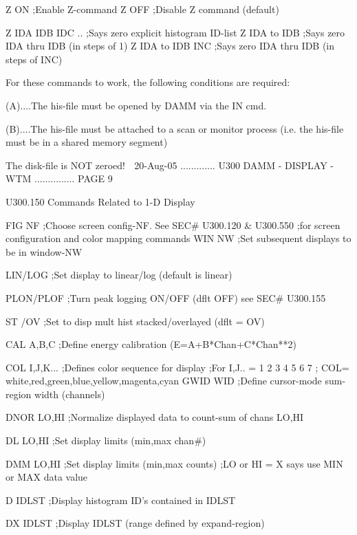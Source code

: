    Z  ON                ;Enable  Z-command
   Z  OFF               ;Disable Z command (default)
 
   Z  IDA IDB IDC ..    ;Says zero explicit histogram ID-list
   Z  IDA to IDB        ;Says zero IDA thru IDB (in steps of 1)
   Z  IDA to IDB INC    ;Says zero IDA thru IDB (in steps of INC)
 
   For these commands to work, the following conditions are required:
 
   (A)....The his-file must be opened by DAMM via the IN cmd.
 
   (B)....The his-file must be attached to a scan or monitor process
          (i.e. the his-file must be in a shared memory segment)
 
                          The disk-file is NOT zeroed!
    
   20-Aug-05 ............. U300  DAMM - DISPLAY - WTM ............... PAGE   9
 
 
   U300.150  Commands Related to 1-D Display
 
   FIG  NF        ;Choose screen config-NF. See SEC# U300.120 & U300.550
                  ;for screen configuration and color mapping commands
   WIN  NW        ;Set subsequent displays to be in window-NW
 
   LIN/LOG        ;Set display to linear/log  (default is linear)
 
   PLON/PLOF      ;Turn peak logging ON/OFF (dflt OFF) see SEC# U300.155
 
   ST /OV         ;Set to disp mult hist stacked/overlayed (dflt = OV)
 
   CAL  A,B,C     ;Define energy calibration (E=A+B*Chan+C*Chan**2)
 
   COL  I,J,K...  ;Defines color sequence for display
                  ;For I,J.. = 1     2   3     4    5    6       7
                  ;       COL= white,red,green,blue,yellow,magenta,cyan
   GWID WID       ;Define cursor-mode sum-region width (channels)
 
   DNOR LO,HI     ;Normalize displayed data to count-sum of chans LO,HI
 
   DL   LO,HI     ;Set display limits (min,max chan#)
 
   DMM  LO,HI     ;Set display limits (min,max counts)
                  ;LO or HI = X  says use MIN or MAX data value
 
   D    IDLST     ;Display histogram ID's contained in IDLST
 
   DX   IDLST     ;Display IDLST (range defined by expand-region)
 
